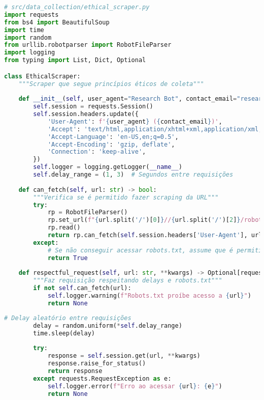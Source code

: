 \begin{pythonbox}
\begin{lstlisting}[language=Python]
# src/data_collection/ethical_scraper.py
import requests
from bs4 import BeautifulSoup
import time
import random
from urllib.robotparser import RobotFileParser
import logging
from typing import List, Dict, Optional

class EthicalScraper:
    """Scraper que segue princípios éticos de coleta"""
    
    def __init__(self, user_agent="Research Bot", contact_email="researcher@university.edu"):
        self.session = requests.Session()
        self.session.headers.update({
            'User-Agent': f'{user_agent} ({contact_email})',
            'Accept': 'text/html,application/xhtml+xml,application/xml;q=0.9,*/*;q=0.8',
            'Accept-Language': 'en-US,en;q=0.5',
            'Accept-Encoding': 'gzip, deflate',
            'Connection': 'keep-alive',
        })
        self.logger = logging.getLogger(__name__)
        self.delay_range = (1, 3)  # Segundos entre requisições
        
    def can_fetch(self, url: str) -> bool:
        """Verifica se é permitido fazer scraping da URL"""
        try:
            rp = RobotFileParser()
            rp.set_url(f"{url.split('/')[0]}//{url.split('/')[2]}/robots.txt")
            rp.read()
            return rp.can_fetch(self.session.headers['User-Agent'], url)
        except:
            # Se não conseguir acessar robots.txt, assume que é permitido
            return True
    
    def respectful_request(self, url: str, **kwargs) -> Optional[requests.Response]:
        """Faz requisição respeitando delays e robots.txt"""
        if not self.can_fetch(url):
            self.logger.warning(f"Robots.txt proíbe acesso a {url}")
            return None

            \end{lstlisting}
\end{pythonbox}

\begin{pythonbox}
\begin{lstlisting}[language=Python]
        # Delay aleatório entre requisições
        delay = random.uniform(*self.delay_range)
        time.sleep(delay)
        
        try:
            response = self.session.get(url, **kwargs)
            response.raise_for_status()
            return response
        except requests.RequestException as e:
            self.logger.error(f"Erro ao acessar {url}: {e}")
            return None
\end{lstlisting}
\end{pythonbox}

